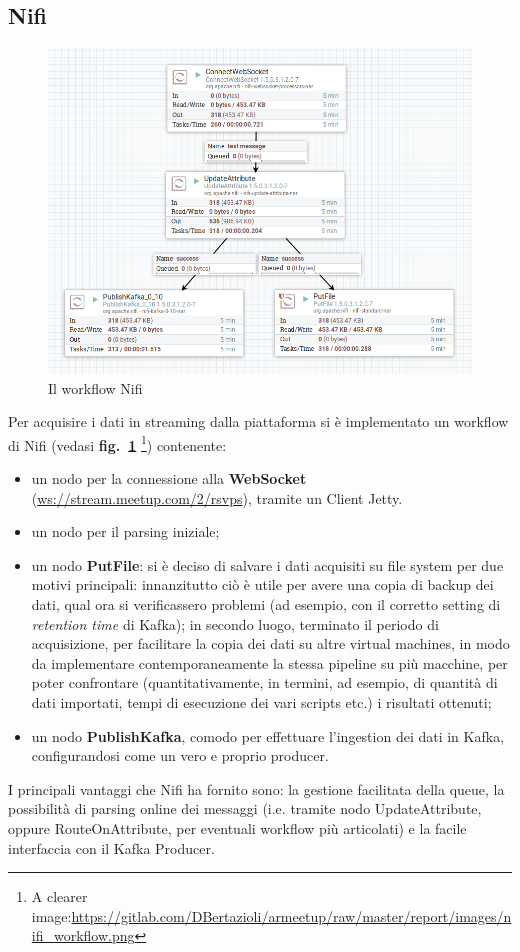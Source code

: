 \documentclass[fleqn,10pt]{SelfArx} %
\begin{document}
{\subsection{Nifi}%
\begin{figure}
\includegraphics[scale=0.3]{images/nifi_workflow.png}
\caption{\footnotesize \label{nifi_workflow} Il workflow Nifi}
\end{figure}
Per acquisire i dati in streaming dalla piattaforma si è implementato un workflow di Nifi (vedasi \textbf{fig.~\ref{nifi_workflow}} \footnote{A clearer image:\url{https://gitlab.com/DBertazioli/armeetup/raw/master/report/images/nifi_workflow.png}}) contenente: 
\begin{itemize} %
\item un nodo per la connessione alla \textbf{WebSocket} (\url{ws://stream.meetup.com/2/rsvps}), tramite un Client Jetty. 
\item un nodo per il parsing iniziale;
\item un nodo \textbf{PutFile}: si è deciso di salvare i dati acquisiti su file system per due motivi principali: innanzitutto ciò è utile per avere una copia di backup dei dati, qual ora si verificassero problemi (ad esempio, con il corretto setting di \textit{retention time} di Kafka); in secondo luogo, terminato il periodo di acquisizione, per facilitare la copia dei dati su altre virtual machines, in modo da implementare contemporaneamente la stessa pipeline su più macchine, per poter confrontare (quantitativamente, in termini, ad esempio, di quantità di dati importati, tempi di esecuzione dei vari scripts etc.) i risultati ottenuti;
\item un nodo \textbf{PublishKafka}, comodo per effettuare l'ingestion dei dati in Kafka, configurandosi come un vero e proprio producer. %
\end{itemize} 
I principali vantaggi che Nifi ha fornito sono: la gestione facilitata della queue, la possibilità di parsing online dei messaggi (i.e. tramite nodo UpdateAttribute, oppure RouteOnAttribute, per eventuali workflow più articolati) e la facile interfaccia con il Kafka Producer.
}
\end{document}
